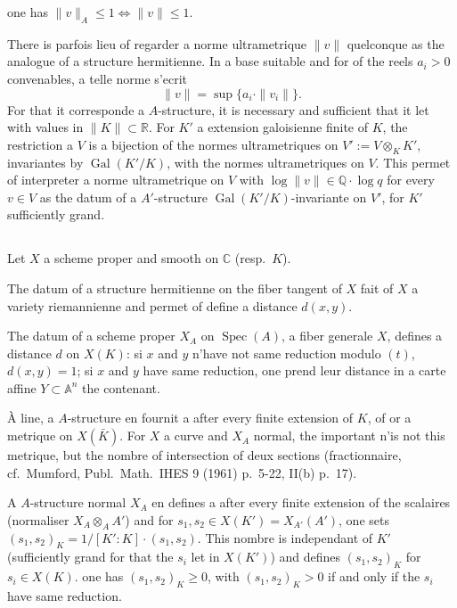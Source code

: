 \documentclass[12pt,a4paper]{article}
\theoremstyle{plain}
\theoremstyle{definition}
\DeclareMathOperator{\Spec}{Spec}
\DeclareMathOperator{\Gal}{Gal}
\newcommand{\QQ}{\mathbb{Q}}
\newcommand{\RR}{\mathbb{R}}
\newcommand{\CC}{\mathbb{C}}
\begin{document}
\smallskip

one has $\|v\|_A \leq 1 \iff \|v\| \leq 1$.

There is parfois lieu of regarder a norme ultrametrique $\|v\|$ quelconque
as the analogue of a structure hermitienne. In a base suitable and for
of the reels $a_i > 0$ convenables, a telle norme s'ecrit
\[
\|v\| = \sup\{a_i \cdot \|v_i\|\} .
\]
For that it corresponde a $A$-structure, it is necessary and sufficient that it let with values in $\|K\| \subset \RR$. For $K'$ a extension galoisienne finite of $K$, the
restriction a $V$ is a bijection of the normes ultrametriques on $V' := V \otimes_K K'$,
invariantes by $\Gal(K'/K)$, with the normes ultrametriques on $V$. This permet
of interpreter a norme ultrametrique on $V$ with $\log \|v\| \in \QQ \cdot \log q$ for every $v \in V$ as the datum of a $A'$-structure $\Gal(K'/K)$-invariante on $V'$,
for $K'$ sufficiently grand.

\subsection{}

Let $X$ a scheme proper and smooth on $\CC$ (resp.\ $K$).

\smallskip

\begin{minipage}[t]{0.48\textwidth}
The datum of a structure
hermitienne on the fiber tangent
of $X$ fait of $X$ a variety
riemannienne and permet of
define a distance $d(x,y)$.
\end{minipage}
\hfill
\begin{minipage}[t]{0.48\textwidth}
The datum of a scheme proper $X_A$ on
$\Spec(A)$, a fiber generale $X$, defines
a distance $d$ on $X(K)$: si $x$ and
$y$ n'have not same reduction modulo $(t)$,
$d(x,y) = 1$; si $x$ and $y$ have same
reduction, one prend leur distance in
a carte affine $Y \subset \mathbb{A}^n$ the contenant.
\end{minipage}

\smallskip

\`A line, a $A$-structure en fournit a after every finite extension of
$K$, of or a metrique on $X(\bar{K})$. For $X$ a curve and $X_A$ normal, the important
n'is not this metrique, but the nombre of intersection of deux sections
(fractionnaire, cf.~Mumford, Publ.\ Math.\ IHES 9 (1961) p.~5-22, II(b) p.~17).

A $A$-structure normal $X_A$ en defines a after every finite extension of the
scalaires (normaliser $X_A \otimes_A A'$) and for $s_1, s_2 \in X(K') = X_{A'}(A')$, one sets
$(s_1, s_2)_K = 1/[K':K] \cdot (s_1, s_2)$. This nombre is independant of $K'$ (sufficiently grand
for that the $s_i$ let in $X(K')$) and defines $(s_1, s_2)_K$ for $s_i \in X(K)$.
one has $(s_1, s_2)_K \geq 0$, with $(s_1, s_2)_K > 0$ if and only if the $s_i$ have same
reduction.
\end{document}
